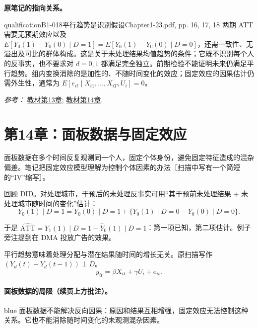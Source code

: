 {\par{}\smallskip\textbf{原笔记的指向关系。}\par\smallskip
{}
\begin{reviewnote}{qualification}{B1-018}{平行趋势是识别假设}{Chapter1-23.pdf, pp. 16, 17, 18}
两期 ATT 需要无预期效应以及 $E[Y_0(1)-Y_0(0)\mid D=1]=E[Y_0(1)-Y_0(0)\mid D=0]$，还需一致性、无溢出及可比的群体构成。这是关于未处理结果均值趋势的条件；它既不识别每个人的反事实，也不要求对 $d=0,1$ 都满足完全独立。前期检验不能证明未来仍满足平行趋势。组内变换消除的是加性的、不随时间变化的效应；固定效应的因果估计仍需外生性，通常为 $E[e_{it}\mid X_{i1},\ldots,X_{iT},U_i]=0$。
\par\smallskip\textit{参考：} \href{https://matheusfacure.github.io/python-causality-handbook/13-Difference-in-Differences.html}{教材第13章}; \href{https://matheusfacure.github.io/python-causality-handbook/14-Panel-Data-and-Fixed-Effects.html}{教材第14章}.
\end{reviewnote}
\section{第14章：面板数据与固定效应}
面板数据在多个时间反复观测同一个人，固定个体身份，避免固定特征造成的混杂偏差。笔记把固定效应模型理解为控制个体因素的办法［扫描中写有一个简短的“IV”缩写］。

回顾 DID。对处理城市，干预后的未处理反事实可用“其干预前未处理结果 + 未处理城市随时间的变化”估计：
\[Y_0(1)\mid D=1
=Y_0(0)\mid D=1+\{Y_0(1)\mid D=0-Y_0(0)\mid D=0\}.
\]

于是 $\widehat{\mathrm{ATT}}=Y_1(1)\mid D=1-\widehat Y_0(1)\mid D=1$：第一项已知，第二项估计。例子旁注提到在 DMA 投放广告的效果。

平行趋势意味着处理分配与潜在结果随时间的增长无关。原扫描写作 $(Y_d(t)-Y_d(t-1))\perp D$。
\[y_{it}=\beta X_{it}+\gamma U_i+e_{it}.\]

\paragraph{面板数据的局限（续页上方批注）。}
\begin{inkblock}{blue}
面板数据不能解决反向因果：原因和结果互相增强，固定效应无法控制这种关系。它也不能消除随时间变化的未观测混杂因素。
\end{inkblock}

}
